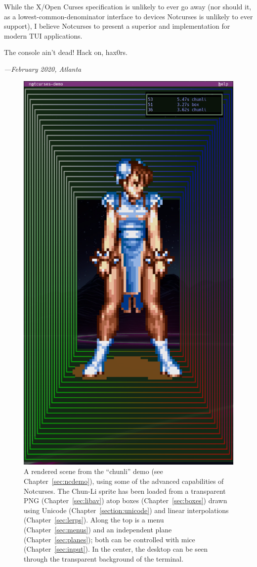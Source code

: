 \documentclass[letterpaper,10pt]{article}
\begin{document}
While the X/Open Curses specification is unlikely to ever go away (nor should
it, as a lowest-common-denominator interface to devices Notcurses is unlikely
to ever support), I believe Notcurses to present a superior and
implementation for modern TUI applications.

The console ain't dead! Hack on, hax0rs.

\vfill

\begin{flushright}
  \textit{---February 2020, Atlanta}
\end{flushright}

\cleardoublepage

\vfill
\begin{figure}
\centering
\includegraphics[width=.65\linewidth]{media/chunli-box-front.png}
\caption[An example render.]{A rendered scene from the ``chunli'' demo (see Chapter~\ref{sec:ncdemo}),
  using some of the advanced capabilities of Notcurses. The Chun-Li sprite has
  been loaded from a transparent PNG (Chapter~\ref{sec:libav}) atop boxes
  (Chapter~\ref{sec:boxes}) drawn using Unicode (Chapter~\ref{section:unicode})
  and linear interpolations (Chapter~\ref{sec:lerps}). Along the top is a
  menu (Chapter~\ref{sec:menus}) and an independent plane (Chapter~\ref{sec:planes});
  both can be controlled with mice (Chapter~\ref{sec:input}). In the center,
  the desktop can be seen through the transparent background of the terminal.}
\end{figure}
\vfill
\cleardoublepage
\end{document}
